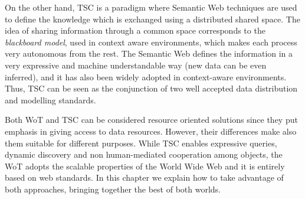 On the other hand, TSC is a paradigm where Semantic Web techniques are used to define the knowledge which is exchanged using a distributed shared space.
The idea of sharing information through a common space corresponds to the \textit{blackboard model}, used in context aware environments, which makes each process very autonomous from the rest.
The Semantic Web defines the information in a very expressive and machine understandable way (new data can be even inferred), and it has also been widely adopted in context-aware environments.
Thus, TSC can be seen as the conjunction of two well accepted data distribution and modelling standards.

Both WoT and TSC can be considered resource oriented solutions since they put emphasis in giving access to data resources.
However, their differences make also them suitable for different purposes.
While TSC enables expressive queries, dynamic discovery and non human-mediated cooperation among objects, the WoT adopts the scalable properties of the World Wide Web and it is entirely based on web standards.
In this chapter we explain how to take advantage of both approaches, bringing together the best of both worlds.



